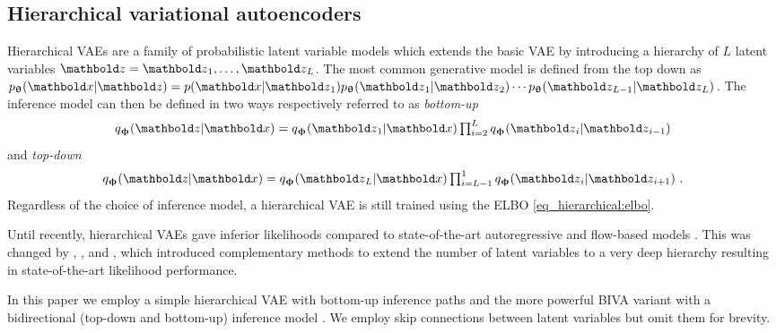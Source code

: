 {\subsection{Hierarchical variational autoencoders}\label{sec_paper_hierarchical:background-hie-VAE}
Hierarchical VAEs are a family of probabilistic latent variable models which extends the basic VAE by introducing a hierarchy of $L$ latent variables $\zb=\zb_1, \dots, \zb_L$.
The most common generative model is defined from the top down as $p_\thetab(\xb|\zb)=p(\xb|\zb_1)p_\thetab(\zb_1|\zb_2)\cdots p_\thetab(\zb_{L-1}|\zb_L)$.
The inference model can then be defined in two ways respectively referred to as \textit{bottom-up} \cite{burda_importance_2016}
\begin{equation}
    q_\phib(\zb|\xb) = q_\phib(\zb_1|\xb)\textstyle\prod_{i=2}^{L} q_\phib(\zb_i|\zb_{i-1})
\end{equation}
and \textit{top-down} \cite{sonderby_ladder_2016}
\begin{equation}
    q_\phib(\zb|\xb) = q_\phib(\zb_L|\xb)\textstyle\prod_{i=L-1}^{1} q_\phib(\zb_{i}|\zb_{i+1}) \ .
\end{equation}
Regardless of the choice of inference model, a hierarchical VAE is still trained using the ELBO \cref{eq_hierarchical:elbo}.

Until recently, hierarchical VAEs gave inferior likelihoods compared to state-of-the-art autoregressive \cite{ho_flow_2019} and flow-based models \cite{salimans_pixelcnn_2017}.
This was changed by \textcite{maaloe_biva_2019}, \textcite{vahdat_nvae_2020}, and \textcite{child_very_2021}, which introduced complementary methods to extend the number of latent variables to a very deep hierarchy resulting in state-of-the-art likelihood performance.

In this paper we employ a simple hierarchical VAE with bottom-up inference paths and the more powerful BIVA variant with a bidirectional (top-down and bottom-up) inference model \cite{maaloe_biva_2019}. We employ skip connections between latent variables but omit them for brevity.


}
